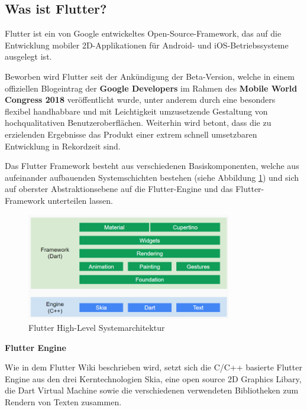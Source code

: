 \documentclass[bibliography=totoc,listof=totoc,BCOR=5mm,DIV=12,oneside]{scrbook}
\begin{document}
\subsection{Was ist Flutter?} 
\par Flutter ist ein von Google entwickeltes Open-Source-Framework, das auf die Entwicklung mobiler 2D-Applikationen für Android- und iOS-Betriebssysteme ausgelegt ist. 
\par \bigskip Beworben wird Flutter seit der Ankündigung der Beta-Version, welche in einem offiziellen Blogeintrag der \textbf{Google Developers}\citep{AnouncingFlutterBeta} im Rahmen des \textbf{Mobile World Congress 2018}\citep{MobileWordCongress} veröffentlicht wurde, unter anderem durch eine besonders flexibel handhabbare und mit Leichtigkeit umzusetzende Gestaltung von hochqualitativen Benutzeroberflächen. Weiterhin wird betont, dass die zu erzielenden Ergebnisse das Produkt einer extrem schnell umsetzbaren Entwicklung \grqq in Rekordzeit\grqq{} sind.

\par \bigskip Das Flutter Framework besteht aus verschiedenen Basiskomponenten, welche aus aufeinander aufbauenden Systemschichten bestehen (siehe Abbildung \ref{img:flutterHighLevelSystemOverview}) und sich auf oberster Abstraktionsebene auf die Flutter-Engine und das Flutter-Framework unterteilen lassen.

\bigskip
\begin{figure}[H]
	\centering
	\includegraphics[width=0.8\textwidth, keepaspectratio]{Bilder/highLevelOverview.png}
	\caption{Flutter High-Level Systemarchitektur \cite{Flu5}}
	\label{img:flutterHighLevelSystemOverview}
\end{figure}

\newpage

\par \bigskip \textbf{Flutter Engine}
\par Wie in dem Flutter Wiki \citep{Flu4} beschrieben wird, setzt sich die C/C++ basierte Flutter Engine aus den drei Kerntechnologien Skia\citep{Skia1}, eine open source 2D Graphics Libary, die Dart Virtual Machine sowie die verschiedenen verwendeten Bibliotheken zum Rendern von Texten zusammen.
\end{document}
